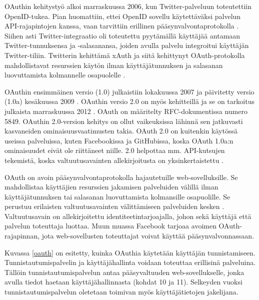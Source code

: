 OAuthin kehitystyö alkoi marraskuussa 2006, kun Twitter-pal\-ve\-luun toteutettiin \mbox{OpenID-tukea}. Pian huomattiin, ettei OpenID sovellu käytettäväksi palvelun API-ra\-ja\-pin\-to\-jen kanssa, vaan tarvittiin erillinen pääsynvalvontaprotokolla \cite{oauth_primer}. Siihen asti Twitter-integraatio oli toteutettu pyytämällä käyttäjää antamaan Twitter-tun\-nuk\-sen\-sa ja -salasanansa, joiden avulla palvelu integroitui käyttäjän Twitter-tiliin. Twitterin kehittämä xAuth ja siitä kehittynyt OAuth-protokolla mahdollistavat resurssien käytön ilman käyttäjätunnuksen ja salasanan luovuttamista kolmannelle osapuolelle \cite{oauth2_0}.

OAuthin ensimmäinen versio (1.0) julkaistiin lokakuussa 2007 ja päivitetty versio (1.0a) kesäkuussa 2009 \cite{oauth2_0}. OAuthin versio 2.0 on myös kehitteillä ja se on tarkoitus julkaista marraskuussa 2012 \cite{oauth2_0}. OAuth on määritelty RFC-dokumentissa numero 5849. OAuthin 2.0-version kehitys on ollut vaikeuksissa lähinnä sen jatkuvasti kasvaneiden ominaisuusvaatimusten takia. OAuth 2.0 on kuitenkin käytössä useissa palveluissa, kuten Facebookissa ja GitHubissa, koska OAuth 1.0a:n ominaisuudet eivät ole riittäneet niille. 2.0 helpottaa mm. API-kutsujen tekemistä, koska valtuutusavainten allekirjoitusta on yksinkertaistettu \cite{oauth2_0}.

OAuth on avoin pääsynvalvontaprotokolla hajautetuille web-sovelluksille. Se mahdollistaa käyttäjien resurssien jakamisen palveluiden välillä ilman käyttäjätunnuksen tai salasanan luovuttamista kolmansille osapuolille. Se perustuu erilaisten valtuutusavainten välittämiseen palveluiden kesken \cite{oauth2_0}. Valtuutusavain on allekirjoitettu identiteetintarjoajalla, johon sekä käyttäjä että palvelun toteuttaja luottaa. Muun muassa Facebook tarjoaa avoimen OAuth-rajapinnan, jota web-sovellusten toteuttajat voivat käyttää pääsynvalvonnassaan.

Kuvassa \ref{oauth} on esitetty, kuinka OAuthia käytetään käyttäjän tunnistamiseen. Tunnistautumispalvelin ja käyttäjähallinta voidaan toteuttaa erillisinä palveluina. Tällöin tunnistautumispalvelun antaa pääsyvaltuuden web-sovellukselle, jonka avulla tiedot haetaan käyttäjähallinnasta (kohdat 10 ja 11). Selkeyden vuoksi tunnistautumispalvelun oletetaan toimivan myös käyttäjätietojen jakelijana.

